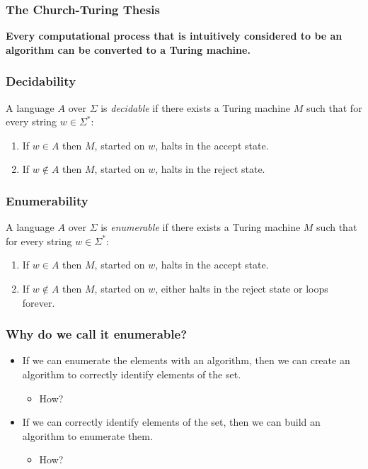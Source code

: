\documentclass{beamer}
\newcommand{\bfr}[1]{\begin{frame}[fragile]\frametitle{{ #1 }}}
\begin{document}
\bfr{The Church-Turing Thesis}

{\Large \bf
  Every computational process that is intuitively considered to
  be an algorithm can be converted to a Turing machine.  }
\end{frame}

\bfr{Decidability}

A language $A$ over $\Sigma$
is {\em decidable} if there exists a Turing machine $M$
such that for every string $w\in\Sigma^*$:
\begin{enumerate}
\item If $w\in A$ then $M$, started on $w$, halts in the accept state.
\item If $w\not\in A$ then $M$, started on $w$, halts in the reject state.
\end{enumerate}
\end{frame}


\bfr{Enumerability}

A language $A$ over $\Sigma$
is {\em enumerable} if there exists a Turing machine $M$
such that for every string $w\in\Sigma^*$:
\begin{enumerate}
\item If $w\in A$ then $M$, started on $w$, halts in the accept state.
\item If $w\not\in A$ then $M$, started on $w$, either halts in the
  reject state or loops forever.
\end{enumerate}
\end{frame}

\bfr{Why do we call it enumerable?}
\begin{itemize}
\item If we can enumerate the elements with an algorithm, then we can
  create an algorithm to correctly identify elements of the set.
  \begin{itemize}\item How? \pause \end{itemize}
  \item If we can correctly identify elements of the set, then we can
    build an algorithm to enumerate them.
  \begin{itemize}\item How? \end{itemize}
\end{itemize}
\end{frame}
\end{document}
